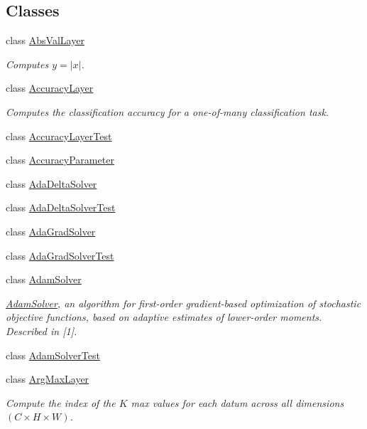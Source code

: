 \subsection*{Classes}
\begin{DoxyCompactItemize}
\item 
class \mbox{\hyperlink{classcaffe_1_1_abs_val_layer}{Abs\+Val\+Layer}}
\begin{DoxyCompactList}\small\item\em Computes $ y = |x| $. \end{DoxyCompactList}\item 
class \mbox{\hyperlink{classcaffe_1_1_accuracy_layer}{Accuracy\+Layer}}
\begin{DoxyCompactList}\small\item\em Computes the classification accuracy for a one-\/of-\/many classification task. \end{DoxyCompactList}\item 
class \mbox{\hyperlink{classcaffe_1_1_accuracy_layer_test}{Accuracy\+Layer\+Test}}
\item 
class \mbox{\hyperlink{classcaffe_1_1_accuracy_parameter}{Accuracy\+Parameter}}
\item 
class \mbox{\hyperlink{classcaffe_1_1_ada_delta_solver}{Ada\+Delta\+Solver}}
\item 
class \mbox{\hyperlink{classcaffe_1_1_ada_delta_solver_test}{Ada\+Delta\+Solver\+Test}}
\item 
class \mbox{\hyperlink{classcaffe_1_1_ada_grad_solver}{Ada\+Grad\+Solver}}
\item 
class \mbox{\hyperlink{classcaffe_1_1_ada_grad_solver_test}{Ada\+Grad\+Solver\+Test}}
\item 
class \mbox{\hyperlink{classcaffe_1_1_adam_solver}{Adam\+Solver}}
\begin{DoxyCompactList}\small\item\em \mbox{\hyperlink{classcaffe_1_1_adam_solver}{Adam\+Solver}}, an algorithm for first-\/order gradient-\/based optimization of stochastic objective functions, based on adaptive estimates of lower-\/order moments. Described in \mbox{[}1\mbox{]}. \end{DoxyCompactList}\item 
class \mbox{\hyperlink{classcaffe_1_1_adam_solver_test}{Adam\+Solver\+Test}}
\item 
class \mbox{\hyperlink{classcaffe_1_1_arg_max_layer}{Arg\+Max\+Layer}}
\begin{DoxyCompactList}\small\item\em Compute the index of the $ K $ max values for each datum across all dimensions $ (C \times H \times W) $. \end{DoxyCompactList}\item 

\end{DoxyCompactItemize}
